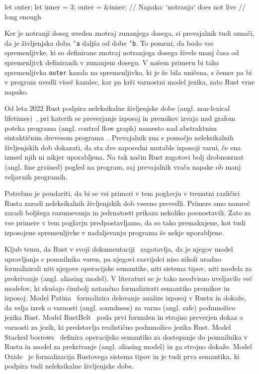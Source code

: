 \begin{rust-failure}
	let outer;
	{
		let inner = 3;
		outer = &inner;  // Napaka: `notranja` does not live
		// long enough
	}
\end{rust-failure}

Ker je notranji doseg uveden znotraj zunanjega dosega, si prevajalnik tudi označi, da je življenjska doba \texttt{'a} daljša od dobe \texttt{'b}. To pomeni, da bodo vse spremenljivke, ki so definirane znotraj notranjega dosega živele manj časa od spremenljivk definiranih v zunanjem dosegu. V našem primeru bi tako spremenljivka \texttt{outer} kazala na spremenljivko, ki je že bila uničena, s čemer pa bi v program uvedli viseč kazalec, kar pa krši varnostni model jezika, zato Rust vrne napako.


Od leta 2022 Rust podpira neleksikalne življenjske dobe (angl. non-lexical lifetimes)~\cite{Matsakis_2018, Matsakis_et_al_2022}, pri katerih se preverjanje izposoj in premikov izvaja nad grafom poteka programa (angl. control flow graph) namesto nad abstraktnim sintaktičnim drevesom programa~\cite{Oxide, StackedBorrows}. Prevajalnik zna s pomočjo neleksikalnih življenjskih dob dokazati, da sta dve zaporedni mutable izposoji varni, če ena izmed njih ni nikjer uporabljena. Na tak način Rust zagotovi bolj drobnozrnat (angl. fine grained) pogled na program, saj prevajalnik vrača napake ob manj veljavnih programih.

Potrebno je poudariti, da bi se vsi primeri v tem poglavju v trenutni različici Rusta zaradi neleksikalnih življenjskih dob vseeno prevedli. Primere smo namreč zaradi boljšega razumevanja in jedrnatosti prikaza nekoliko poenostavili. Zato za vse primere v tem poglavju predpostavljamo, da so tako premaknjene, kot tudi izposojene spremenljivke v nadaljevanju programa še nekje uporabljene.

Kljub temu, da Rust v svoji dokumentaciji~\cite{klabnik2023rust} zagotavlja, da je njegov model upravljanja s pomnilnika varen, pa njegovi razvijalci niso nikoli uradno formalizirali niti njegove operacijske semantike, niti sistema tipov, niti modela za prekrivanje (angl. aliasing model). V literaturi se je tako neodvisno uveljavilo več modelov, ki skušajo čimbolj natančno formalizirati semantiko premikov in izposoj. Model Patina~\cite{reed2015patina} formalizira delovanje analize izposoj v Rustu in dokaže, da velja izrek o varnosti (angl. soundness) za varno (angl. safe) podmnožico jezika Rust. Model RustBelt~\cite{10.1145/3158154} poda prvi formalen in strojno preverjen dokaz o varnosti za jezik, ki predstavlja realistično podmnožico jezika Rust. Model Stacked borrows~\cite{StackedBorrows} definira operacijsko semantiko za dostopanje do pomnilnika v Rustu in model za prekrivanje (angl. aliasing model) in ga strojno dokaže. Model Oxide~\cite{Oxide} je formalizacija Rustovega sistema tipov in je tudi prva semantika, ki podpira tudi neleksikalne življenjske dobe. 
